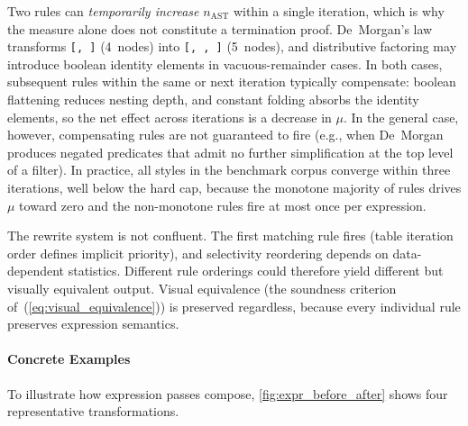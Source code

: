 Two rules can \emph{temporarily increase} $n_{\mathrm{AST}}$ within a single iteration, which is why the measure alone does not constitute a termination proof.
De~Morgan's law transforms \texttt{[, ]} (4~nodes) into \texttt{[, , ]} (5~nodes), and distributive factoring may introduce boolean identity elements in vacuous-remainder cases.
In both cases, subsequent rules within the same or next iteration typically compensate: boolean flattening reduces nesting depth, and constant folding absorbs the identity elements, so the net effect across iterations is a decrease in $\mu$.
In the general case, however, compensating rules are not guaranteed to fire (e.g., when De~Morgan produces negated predicates that admit no further simplification at the top level of a filter).
In practice, all styles in the benchmark corpus converge within three iterations, well below the hard cap, because the monotone majority of rules drives $\mu$ toward zero and the non-monotone rules fire at most once per expression.

The rewrite system is not confluent.
The first matching rule fires (table iteration order defines implicit priority), and selectivity reordering depends on data-dependent statistics.
Different rule orderings could therefore yield different but visually equivalent output.
Visual equivalence (the soundness criterion of~(\ref{eq:visual_equivalence})) is preserved regardless, because every individual rule preserves expression semantics.



\paragraph{Concrete Examples}
To illustrate how expression passes compose, \cref{fig:expr_before_after} shows four representative transformations.

